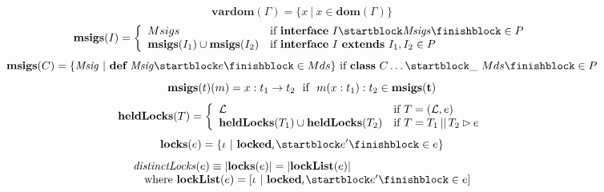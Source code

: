 \[
\mathbf{vardom}(\Gamma) = \{x~|~x\in\mathbf{dom}(\Gamma)\}
\]
%
\[
\mathbf{msigs}(I) =
\left\{
\begin{array}{l l}
Msigs & \mbox{if } \kw{interface}~I\SB \mathit{Msigs} \FB \in P\\
\mathbf{msigs}(I_1)\cup\mathbf{msigs}(I_2) & \mbox{if } \kw{interface}~I~\kw{extends}~I_1,I_2 \in P\\
\end{array}
\right.
\]
%
\[
\mathbf{msigs}(C) = \{\mathit{Msig}~|~\kw{def}~\mathit{Msig}\SB e \FB \in Mds\}
\mbox{ if } \kw{class}~C \dots\SB \_~Mds \FB \in P
\]
%
\[
\mathbf{msigs}(t)(m) = x : t_1 \rightarrow t_2$ \mbox{ if } $m(x : t_1) : t_2 \in \mathbf{msigs(t)}
\]
%
\[
\mathbf{heldLocks}(T) =
\left\{
\begin{array}{l l}
\mathcal{L} & \mbox{if } T = (\mathcal{L}, e)\\
\mathbf{heldLocks}(T_1)\cup\mathbf{heldLocks}(T_2) & \mbox{if } T = T_1 \mathop{||} T_2 \rhd e
\end{array}
\right.
\]
%
\[
\mathbf{locks}(e) = \{\iota~|~\kw{locked}_\iota\SB e' \FB \in e\}
\]
%
\[
\begin{array}{l}
\mathit{distinctLocks}(e) \equiv |\mathbf{locks}(e)| = |\mathbf{lockList}(e)|\\
\quad\mbox{where } \mathbf{lockList}(e) = [\iota~|~\kw{locked}_\iota\SB e' \FB \in e]
\end{array}
\]
